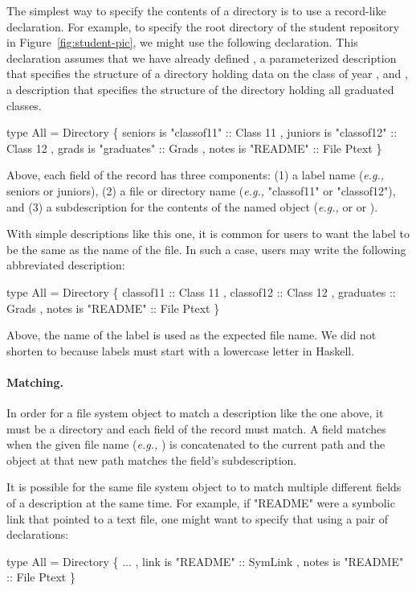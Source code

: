 \documentclass[nocopyrightspace,natbib]{sigplanconf}
\begin{document}
The simplest way to specify the contents of a directory is to use
a record-like declaration.  For example, to specify the root directory
of the student repository in Figure~\ref{fig:student-pic}, we might use
the following declaration.  This declaration assumes that we have already
defined , a parameterized description that specifies
the structure of a directory holding data on the class of year ,
and , a description that specifies the structure of the directory holding
all graduated classes.   
\begin{code}
type All = Directory
  \{ seniors is "classof11" :: Class 11
  , juniors is "classof12" :: Class 12
  , grads is "graduates" :: Grads
  , notes is "README" :: File Ptext
  \}
\end{code}
Above, each field of the record has three components:  (1) a label
name ({\it e.g.,} seniors or juniors), (2) a file or directory name
({\it e.g.,} "classof11" or "classof12"), and (3) a \forest{} subdescription
for the contents of the named object ({\it e.g.,}  or 
or ).

With simple descriptions like this one, it is common for users to want
the label to be the same as the name of the file.  In such a case, users
may write the following abbreviated description:
\begin{code}
type All = Directory
  \{ classof11 :: Class 11
  , classof12 :: Class 12
  , graduates :: Grads
  , notes is "README" :: File Ptext
  \}
\end{code}
Above, the name of the label is used as the expected file name.  We did not
shorten  to  because labels must start
with a lowercase letter in Haskell.

\paragraph*{Matching.}
In order for a file system object to match a description like the one above, it must be a
directory and each field of the record must match.  A field matches when the given
file name ({\em e.g.,} ) is concatenated to the current path and the 
object at that new path matches the field's subdescription.

It is possible for the same file system object to to match multiple different fields of a description at
the same time.  For example, if "README" were a symbolic link that pointed to a text file, one 
might want to specify that using a pair of declarations:
\begin{code}
type All = Directory
  \{ ...
  , link is "README" :: SymLink
  , notes is "README" :: File Ptext
  \}
\end{code}
\end{document}
